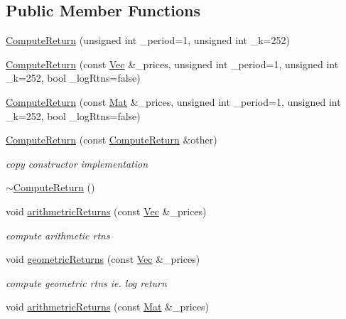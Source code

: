 \subsection*{Public Member Functions}
\begin{DoxyCompactItemize}
\item 
\hyperlink{classComputeReturn_a5ddfc65ef8a500beffff33cc3f416271}{Compute\+Return} (unsigned int \+\_\+period=1, unsigned int \+\_\+k=252)
\item 
\hyperlink{classComputeReturn_a8431159bc745ac489ae4c813bd34e540}{Compute\+Return} (const \hyperlink{compute__returns__eigen_8h_a1eb6a9306ef406d7975f3cbf2e247777}{Vec} \&\+\_\+prices, unsigned int \+\_\+period=1, unsigned int \+\_\+k=252, bool \+\_\+log\+Rtns=false)
\item 
\hyperlink{classComputeReturn_a2e58c2c7e9d0f2735ceb9fdcdf0dcdde}{Compute\+Return} (const \hyperlink{compute__returns__eigen_8h_ae14dd28696f743e067dbd2594616bad6}{Mat} \&\+\_\+prices, unsigned int \+\_\+period=1, unsigned int \+\_\+k=252, bool \+\_\+log\+Rtns=false)
\item 
\hyperlink{classComputeReturn_aa737a4b9280f349201191db08e95ce9a}{Compute\+Return} (const \hyperlink{classComputeReturn}{Compute\+Return} \&other)
\begin{DoxyCompactList}\small\item\em copy constructor implementation \end{DoxyCompactList}\item 
\hyperlink{classComputeReturn_adf0a518447b70fd8990c2e06be3edb1b}{$\sim$\+Compute\+Return} ()
\item 
void \hyperlink{classComputeReturn_a3a6c9c21aa99b02dc6f2efd2b32091b8}{arithmetric\+Returns} (const \hyperlink{compute__returns__eigen_8h_a1eb6a9306ef406d7975f3cbf2e247777}{Vec} \&\+\_\+prices)
\begin{DoxyCompactList}\small\item\em compute arithmetic rtns \end{DoxyCompactList}\item 
void \hyperlink{classComputeReturn_a6c7c54511bec213c7359e041ec469e78}{geometric\+Returns} (const \hyperlink{compute__returns__eigen_8h_a1eb6a9306ef406d7975f3cbf2e247777}{Vec} \&\+\_\+prices)
\begin{DoxyCompactList}\small\item\em compute geometric rtns ie. log return \end{DoxyCompactList}\item 
void \hyperlink{classComputeReturn_a8c26c2417285e0d00204ac97b16ea05b}{arithmetric\+Returns} (const \hyperlink{compute__returns__eigen_8h_ae14dd28696f743e067dbd2594616bad6}{Mat} \&\+\_\+prices)

\end{DoxyCompactItemize}
